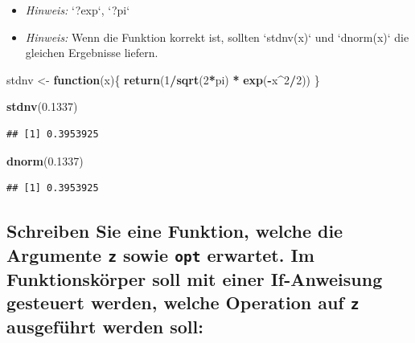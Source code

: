 \documentclass[12pt,a4paper]{article}
\newenvironment{Shaded}{\begin{snugshade}}{\end{snugshade}}
\newcommand{\ControlFlowTok}[1]{\textcolor[rgb]{0.13,0.29,0.53}{\textbf{#1}}}
\newcommand{\DecValTok}[1]{\textcolor[rgb]{0.00,0.00,0.81}{#1}}
\newcommand{\FloatTok}[1]{\textcolor[rgb]{0.00,0.00,0.81}{#1}}
\newcommand{\FunctionTok}[1]{\textcolor[rgb]{0.13,0.29,0.53}{\textbf{#1}}}
\newcommand{\NormalTok}[1]{#1}
\newcommand{\OtherTok}[1]{\textcolor[rgb]{0.56,0.35,0.01}{#1}}
\newcommand{\SpecialCharTok}[1]{\textcolor[rgb]{0.81,0.36,0.00}{\textbf{#1}}}
\begin{document}
\begin{itemize}
  \item \textit{Hinweis:} `?exp`, `?pi`
  \item \textit{Hinweis:} Wenn die Funktion korrekt ist, sollten `stdnv(x)` und `dnorm(x)` die gleichen Ergebnisse liefern.
\end{itemize}

\begin{Shaded}
\begin{Highlighting}[]
\NormalTok{    stdnv }\OtherTok{\textless{}{-}} \ControlFlowTok{function}\NormalTok{(x)\{}
      \FunctionTok{return}\NormalTok{(}\DecValTok{1}\SpecialCharTok{/}\FunctionTok{sqrt}\NormalTok{(}\DecValTok{2}\SpecialCharTok{*}\NormalTok{pi) }\SpecialCharTok{*} \FunctionTok{exp}\NormalTok{(}\SpecialCharTok{{-}}\NormalTok{x}\SpecialCharTok{\^{}}\DecValTok{2}\SpecialCharTok{/}\DecValTok{2}\NormalTok{))}
\NormalTok{    \}}
    
    \FunctionTok{stdnv}\NormalTok{(}\FloatTok{0.1337}\NormalTok{)}
\end{Highlighting}
\end{Shaded}

\begin{verbatim}
## [1] 0.3953925
\end{verbatim}

\begin{Shaded}
\begin{Highlighting}[]
    \FunctionTok{dnorm}\NormalTok{(}\FloatTok{0.1337}\NormalTok{)}
\end{Highlighting}
\end{Shaded}

\begin{verbatim}
## [1] 0.3953925
\end{verbatim}

\hypertarget{schreiben-sie-eine-funktion-welche-die-argumente-z-sowie-opt-erwartet.-im-funktionskuxf6rper-soll-mit-einer-if-anweisung-gesteuert-werden-welche-operation-auf-z-ausgefuxfchrt-werden-soll}{%
\subsection{\texorpdfstring{Schreiben Sie eine Funktion, welche die
Argumente \texttt{z} sowie \texttt{opt} erwartet. Im Funktionskörper
soll mit einer If-Anweisung gesteuert werden, welche Operation auf
\texttt{z} ausgeführt werden
soll:}{Schreiben Sie eine Funktion, welche die Argumente z sowie opt erwartet. Im Funktionskörper soll mit einer If-Anweisung gesteuert werden, welche Operation auf z ausgeführt werden soll:}}\label{schreiben-sie-eine-funktion-welche-die-argumente-z-sowie-opt-erwartet.-im-funktionskuxf6rper-soll-mit-einer-if-anweisung-gesteuert-werden-welche-operation-auf-z-ausgefuxfchrt-werden-soll}}
\end{document}
